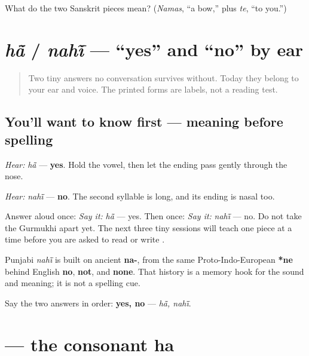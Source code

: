\begin{tcolorbox}[breakable,colback=teal!4,colframe=teal!35!black,title={Before you move on}]
What do the two Sanskrit pieces mean? (\emph{Namas}, “a bow,” plus \emph{te}, “to you.”)
\end{tcolorbox}
\section[\texorpdfstring{\pa{ਹਾਂ} / \pa{ਨਹੀਂ} (hā̃ / nahī̃)}{ਹਾਂ / ਨਹੀਂ (hā̃ / nahī̃)}]{\emph{hā̃} / \emph{nahī̃} — “yes” and “no” by ear}

\label{lesson:PA-C01-han-nahin}



\begin{quote}
Two tiny answers no conversation survives without. Today they belong to your ear and voice. The printed forms are labels, not a reading test.
\end{quote}

\subsection*{You'll want to know first — meaning before spelling}
\emph{Hear:} \emph{hā̃} — \textbf{yes}. Hold the vowel, then let the ending pass gently through the nose.

\emph{Hear:} \emph{nahī̃} — \textbf{no}. The second syllable is long, and its ending is nasal too.

Answer aloud once: \emph{Say it:} \emph{hā̃} — yes. Then once: \emph{Say it:} \emph{nahī̃} — no. Do not take the Gurmukhi apart yet. The next three tiny sessions will teach one piece at a time before you are asked to read or write \textbf{}.

\begin{cousinweb}
Punjabi \emph{nahī̃} is built on ancient \textbf{na-}, from the same Proto-Indo-European \textbf{*ne} behind English \textbf{no}, \textbf{not}, and \textbf{none}. That history is a memory hook for the sound and meaning; it is not a spelling cue.
\end{cousinweb}

\begin{tcolorbox}[breakable,colback=teal!4,colframe=teal!35!black,title={Before you move on}]
Say the two answers in order: \textbf{yes, no} — \emph{hā̃, nahī̃}.
\end{tcolorbox}
\section[\texorpdfstring{\pa{ਹ} (ha)}{ਹ (ha)}]{ — the consonant ha}

